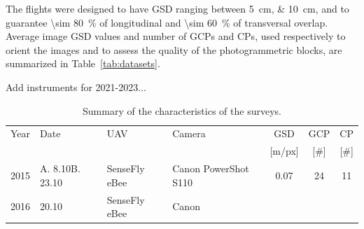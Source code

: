The flights were designed to have GSD ranging between \qtylist{5;10}{\centi\meter}, and
to guarantee \qty{\sim 80}{\percent} of longitudinal and \qty{\sim 60}{\percent} of
transversal overlap.
Average image GSD values and number of GCPs and CPs, used respectively to orient the
images and to assess the quality of the photogrammetric blocks, are summarized in
Table~\ref{tab:datasets}.

{\color{red} Add instruments for 2021-2023...}

\begin{table}
    \small
    \centering
    \caption{Summary of the characteristics of the surveys.}
    \begin{tabular}{c  m{1.5cm} m{3.5cm} m{3.7cm} c c c }
        \toprule
        Year                                                              & Date
                                                                          & UAV
                                                                          & Camera
                                                                          & GSD
                                                                          & GCP
                                                                          & CP
        \\
                                                                          &
                                                                          &
                                                                          &
                                                                          & [m/px]
                                                                          & [\#]
                                                                          & [\#]
        \\
        \midrule
        2015                                                              & A.
        8.10\newline B. 23.10                                             &
        SenseFly eBee                                                     & Canon
        PowerShot S110                                                    & 0.07
                                                                          & 24
                                                                          & 11
        \\[4mm]
        2016                                                              & 20.10
                                                                          & SenseFly eBee
                                                                          & Canon

\end{tabular}
\end{table}
